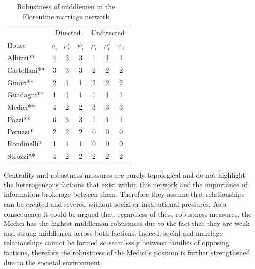 \begin{table}
\centering
\begin{tabular}{lcccccc}
\hline \hline
  & \multicolumn{3}{c}{Directed}   & \multicolumn{3}{c}{Undirected}      \\
House   & $\rho_{i}$ & $\rho^{\star}_{i}$ & $\psi_{i}$ & $\rho_{i}$ & $\rho^{\star}_{i}$ & $\psi_{i}$ \\
\hline
Albizzi**    & 4            & 3           & 3            & 1            & 1           & 1            \\
Castellani** & 3            & 3           & 3            & 2            & 2           & 2            \\
Ginori**     & 2            & 1           & 1            & 2            & 2           & 2            \\
Guadagni**   & 1            & 1           & 1            & 1            & 1           & 1            \\
Medici**     & 4            & 2           & 2            & 3            & 3           & 3            \\
Pazzi**      & 6            & 3           & 3            & 1            & 1           & 1            \\
Peruzzi*     & 2            & 2           & 2            & 0            & 0           & 0            \\
Rondinelli*  & 1            & 1           & 1            & 0            & 0           & 0            \\
Strozzi**    & 4            & 2           & 2            & 2            & 2           & 2            \\
\hline \hline
\end{tabular}
\caption{Robustness of middlemen in the Florentine marriage network}
\label{FlorenceRobust}
\end{table}

\medskip \noindent Centrality and robustness measures are purely topological and do not highlight the heterogeneous factions that exist within this network and the importance of information brokerage between them. Therefore they assume that relationships can be created and severed without social or institutional pressures. As a consequence it could be argued that, regardless of these robustness measures, the Medici has the highest middleman robustness due to the fact that they are weak and strong middlemen across both factions. Indeed, social and marriage relationships cannot be formed so seamlessly between families of opposing factions, therefore the robustness of the Medici's position is further strengthened due to the societal environment.

